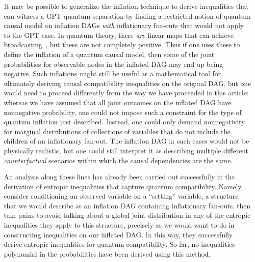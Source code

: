 \documentclass[aps,english,superscriptaddress,onecolumn,twoside,longbibliography,pra,floatfix,fleqn,nofootinbib]{revtex4-1}%
\theoremstyle{definition}
\begin{document}
It may be possible to generalize the inflation technique to derive inequalities that can witness a GPT-quantum separation by finding a restricted notion of quantum causal model on inflation DAGs \emph{with} inflationary fan-outs that would not apply to the GPT case.
In quantum theory, there {\em are} linear maps that can achieve broadcasting~\cite{Coecke2011}, but these are not completely positive. Thus if one uses these to define the inflation of a quantum causal model, then some of the joint probabilities for observable nodes in the inflated DAG may end up being negative.  Such inflations might still be useful as a mathematical tool for ultimately deriving causal compatibility inequalities on the original DAG, but one would need to proceed differently from the way we have proceeded in this article: whereas we have assumed that all joint outcomes on the inflated DAG have nonnegative probability, one could not impose such a constraint for the type of quantum inflation just described.  Instead, one could only demand nonnegativity for marginal distributions of collections of variables that do not include the children of an inflationary fan-out. The inflation DAG in such cases would not be physically realistic, but one could still interpret it as describing multiple different {\em counterfactual} scenarios within which the causal dependencies are the same.

An analysis along these lines has already been carried out successfully in the derivation of entropic inequalities that capture quantum compatibility. Namely, \citet{Chaves2015infoquantum} consider conditioning an observed variable on a ``setting'' variable, a structure that we would describe as an inflation DAG containing inflationary fan-outs. \citet{Chaves2015infoquantum} then take pains to avoid talking about a global joint distribution in any of the entropic inequalities they apply to this structure, %
precisely as we would want to do in constructing inequalities on our inflated DAG. In this way, they successfully derive entropic inequalities for quantum compatibility. So far, no inequalities polynomial in the probabilities have been derived using this method.

\end{document}
